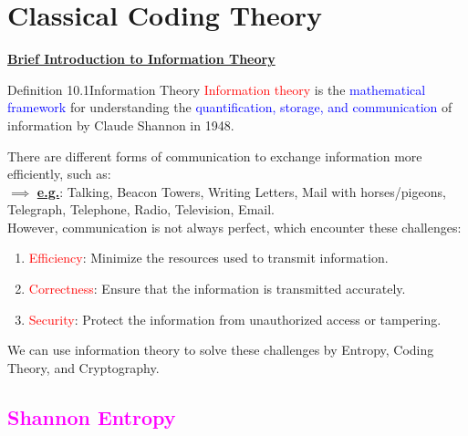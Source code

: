 \documentclass{book}
\begin{document}
\chapter{Classical Coding Theory}
\uline{\textbf{\large Brief Introduction to Information Theory}}\\
\begin{defBox}{Definition 10.1}{Information Theory}
    \textcolor{red}{Information theory} is the \textcolor{blue}{mathematical framework} for understanding the \textcolor{blue}{quantification, storage, and communication} of information by Claude Shannon in 1948.
\end{defBox}
There are different forms of communication to exchange information more efficiently, such as:\\
$\implies$ \uline{\textbf{e.g.}}: Talking, Beacon Towers, Writing Letters, Mail with horses/pigeons, Telegraph, Telephone, Radio, Television, Email.\\
\vspace{2mm}
However, communication is not always perfect, which encounter these challenges:
\begin{enumerate}
    \item \textcolor{red}{Efficiency}: Minimize the resources used to transmit information.
    \item \textcolor{red}{Correctness}: Ensure that the information is transmitted accurately.
    \item \textcolor{red}{Security}: Protect the information from unauthorized access or tampering.
\end{enumerate}
We can use information theory to solve these challenges by Entropy, Coding Theory, and Cryptography.

\textcolor{magenta}{\section{\textbf{Shannon Entropy}}}
\end{document}
